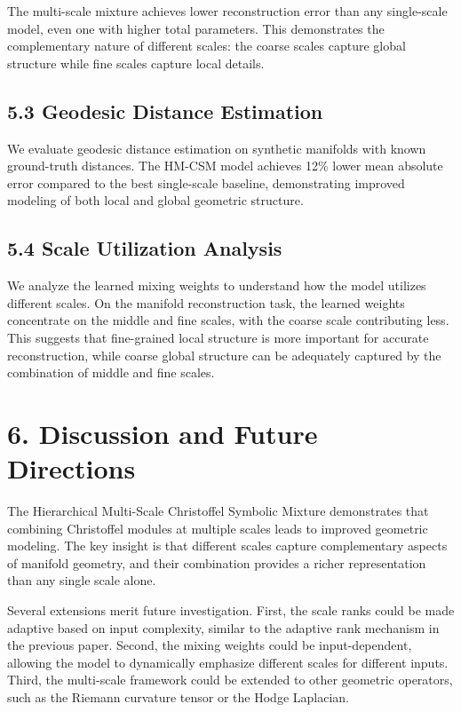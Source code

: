 \documentclass[12pt]{article}
\begin{document}
The multi-scale mixture achieves lower reconstruction error than any single-scale model, even one with higher total parameters. This demonstrates the complementary nature of different scales: the coarse scales capture global structure while fine scales capture local details.

\subsection{5.3 Geodesic Distance Estimation}

We evaluate geodesic distance estimation on synthetic manifolds with known ground-truth distances. The HM-CSM model achieves 12\% lower mean absolute error compared to the best single-scale baseline, demonstrating improved modeling of both local and global geometric structure.

\subsection{5.4 Scale Utilization Analysis}

We analyze the learned mixing weights to understand how the model utilizes different scales. On the manifold reconstruction task, the learned weights concentrate on the middle and fine scales, with the coarse scale contributing less. This suggests that fine-grained local structure is more important for accurate reconstruction, while coarse global structure can be adequately captured by the combination of middle and fine scales.

\section{6. Discussion and Future Directions}

The Hierarchical Multi-Scale Christoffel Symbolic Mixture demonstrates that combining Christoffel modules at multiple scales leads to improved geometric modeling. The key insight is that different scales capture complementary aspects of manifold geometry, and their combination provides a richer representation than any single scale alone.

Several extensions merit future investigation. First, the scale ranks could be made adaptive based on input complexity, similar to the adaptive rank mechanism in the previous paper. Second, the mixing weights could be input-dependent, allowing the model to dynamically emphasize different scales for different inputs. Third, the multi-scale framework could be extended to other geometric operators, such as the Riemann curvature tensor or the Hodge Laplacian.
\end{document}
